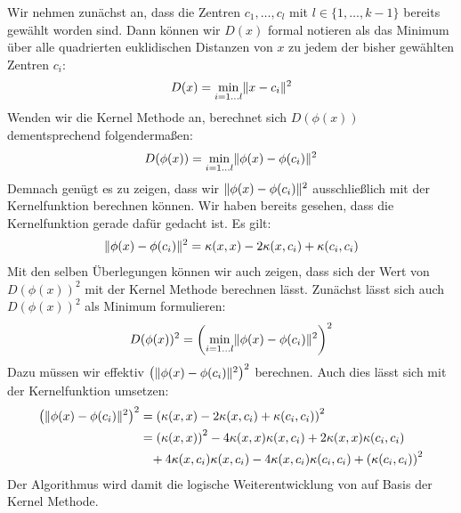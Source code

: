 Wir nehmen zunächst an, dass die Zentren $c_1, \dots, c_l$ mit $l \in \{ 1, \dots, k-1 \}$ bereits gewählt worden sind.
Dann können wir $D(x)$ formal notieren als das Minimum über alle quadrierten euklidischen Distanzen von $x$ zu jedem der bisher
gewählten Zentren $c_i$:
\[ D(x) = \min_{i = 1 \dots l} \lVert {x} - {c_i} \rVert^2 \]
Wenden wir die Kernel Methode an, berechnet sich $D(\phi(x))$ dementsprechend folgendermaßen:
\[ D(\phi(x)) = \min_{i = 1 \dots l} \lVert {\phi(x)} - {\phi(c_i)} \rVert^2 \]
Demnach genügt es zu zeigen, dass wir $\lVert {\phi(x)} - {\phi(c_i)} \rVert^2$ ausschließlich mit der Kernelfunktion berechnen
können. Wir haben bereits gesehen, dass die Kernelfunktion gerade dafür gedacht ist. Es gilt:
\begin{align}
	\lVert {\phi(x)} - {\phi(c_i)} \rVert^2 = \kappa(x,x) - 2 \kappa(x,c_i) + \kappa(c_i,c_i)
\end{align}
Mit den selben Überlegungen können wir auch zeigen, dass sich der Wert von $D(\phi(x))^2$ mit der Kernel Methode berechnen lässt.
Zunächst lässt sich auch $D(\phi(x))^2$ als Minimum formulieren:
\[ D(\phi(x))^2 = \left( \min_{i = 1 \dots l} \lVert {\phi(x)} - {\phi(c_i)} \rVert^2 \right)^2 \]
Dazu müssen wir effektiv $\left( \lVert {\phi(x)} - {\phi(c_i)} \rVert^2 \right)^2$ berechnen. Auch dies lässt sich mit der
Kernelfunktion umsetzen:
\begin{align}
\label{formula:kkmpp}
	\left( \lVert {\phi(x)} - {\phi(c_i)} \rVert^2 \right)^2 &= \left( \kappa(x,x) - 2 \kappa(x,c_i) + \kappa(c_i,c_i) \right)^2 \nonumber \\
	&= \left(\kappa(x,x)\right)^2 - 4 \kappa(x,x) \kappa(x,c_i) + 2 \kappa(x,x) \kappa(c_i,c_i) \nonumber \\
	& \; \; \; + 4 \kappa(x,c_i) \kappa(x,c_i) - 4 \kappa(x,c_i) \kappa(c_i,c_i) + \left(\kappa(c_i,c_i)\right)^2
\end{align}
Der Algorithmus \kkmpp{} wird damit die logische Weiterentwicklung von \kmpp{} auf Basis der Kernel Methode.

